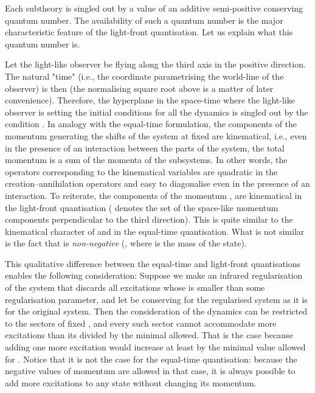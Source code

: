 \documentclass[a4paper,12pt]{article}
\begin{document}
Each subtheory is singled out by a value of an additive 
semi-positive conserving 
quantum number. The availability of such a quantum number is 
the major characteristic feature of the light-front quantisation. 
Let us explain what 
this quantum number is.

Let the light-like observer 
be flying along the third axis 
in the positive direction. 
The natural "time" (i.e., the coordinate 
parametrising the world-line 
of the observer) is then \coordHE{}
(the normalising square root above is a matter of later convenience).
Therefore, the hyperplane in the space-time where the light-like 
observer is setting the 
initial conditions for all the dynamics is singled out by 
the condition \coordHE{}. 
In analogy with the equal-time formulation,
the components of the momentum generating the shifts of the system at
fixed \coordHE{} are kinematical, i.e., even in the presence of 
an interaction between the parts of the system, the total momentum 
is a sum of the momenta of the subsystems. 
In other words, the operators corresponding to the kinematical 
variables are quadratic in the creation--annihilation operators 
and easy to diagonalise  even in the 
presence of an interaction. To reiterate, the components 
of the momentum \coordHE{}, \coordHE{} are 
kinematical in the light-front quantisation
(\coordHE{} denotes the set of the space-like momentum components 
perpendicular to the third direction). 
This is quite similar to the kinematical character of 
\coordHE{} and \coordHE{} in the equal-time quantisation. 
What is not similar is the fact that 
\coordHE{} is {\it non-negative} 
(\coordHE{}, 
where \coordHE{} is the mass of the state). 

This qualitative difference between the equal-time and 
light-front quantisations 
enables the following consideration: Suppose we make an infrared 
regularisation of the system that discards all excitations whose 
\coordHE{} is smaller than some 
regularisation parameter, and let \coordHE{} 
be conserving for 
the regularised system as 
it is for the original system. Then the consideration of the dynamics 
can be restricted to the sectors of fixed 
\coordHE{}, and  
every such sector cannot accommodate 
more excitations than its \coordHE{} divided by the minimal \coordHE{} allowed. 
That is the case because adding one more excitation would 
increase \coordHE{} at least by the 
minimal value allowed for \coordHE{}. Notice 
that it is not the case for 
the equal-time quantisation: because the negative values of momentum 
are allowed in that case, it is always possible to add more 
excitations to any state without changing its momentum.
\end{document}
